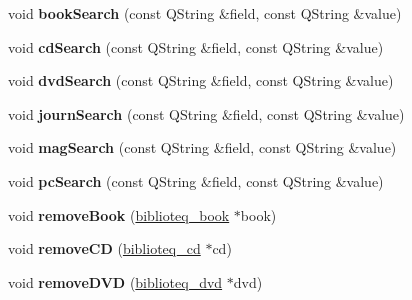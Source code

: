 \begin{DoxyCompactItemize}
\item 
void {\bfseries book\+Search} (const Q\+String \&field, const Q\+String \&value)\hypertarget{classbiblioteq_a42c5a134c4e911e157fd1b6e694c5452}{}\label{classbiblioteq_a42c5a134c4e911e157fd1b6e694c5452}

\item 
void {\bfseries cd\+Search} (const Q\+String \&field, const Q\+String \&value)\hypertarget{classbiblioteq_a3ea36c2342bc706c3b7fbbc61c720de0}{}\label{classbiblioteq_a3ea36c2342bc706c3b7fbbc61c720de0}

\item 
void {\bfseries dvd\+Search} (const Q\+String \&field, const Q\+String \&value)\hypertarget{classbiblioteq_a33ba3747af1b89b420dc813cda8d8842}{}\label{classbiblioteq_a33ba3747af1b89b420dc813cda8d8842}

\item 
void {\bfseries journ\+Search} (const Q\+String \&field, const Q\+String \&value)\hypertarget{classbiblioteq_a498e7e1e73f177af81c844626e4c5ee1}{}\label{classbiblioteq_a498e7e1e73f177af81c844626e4c5ee1}

\item 
void {\bfseries mag\+Search} (const Q\+String \&field, const Q\+String \&value)\hypertarget{classbiblioteq_a015f420e14b8b277de870d317275289d}{}\label{classbiblioteq_a015f420e14b8b277de870d317275289d}

\item 
void {\bfseries pc\+Search} (const Q\+String \&field, const Q\+String \&value)\hypertarget{classbiblioteq_a2c0e14a67b18f830933fd457b6d6bc5a}{}\label{classbiblioteq_a2c0e14a67b18f830933fd457b6d6bc5a}

\item 
void {\bfseries remove\+Book} (\hyperlink{classbiblioteq__book}{biblioteq\+\_\+book} $\ast$book)\hypertarget{classbiblioteq_a2979cfdcec7595bddc0f2d0447803260}{}\label{classbiblioteq_a2979cfdcec7595bddc0f2d0447803260}

\item 
void {\bfseries remove\+CD} (\hyperlink{classbiblioteq__cd}{biblioteq\+\_\+cd} $\ast$cd)\hypertarget{classbiblioteq_ab00724d6107603490dd5ecccdfd66704}{}\label{classbiblioteq_ab00724d6107603490dd5ecccdfd66704}

\item 
void {\bfseries remove\+D\+VD} (\hyperlink{classbiblioteq__dvd}{biblioteq\+\_\+dvd} $\ast$dvd)\hypertarget{classbiblioteq_a4e50365e71f53b9d89c3fe929dc30566}{}\label{classbiblioteq_a4e50365e71f53b9d89c3fe929dc30566}


\end{DoxyCompactItemize}

